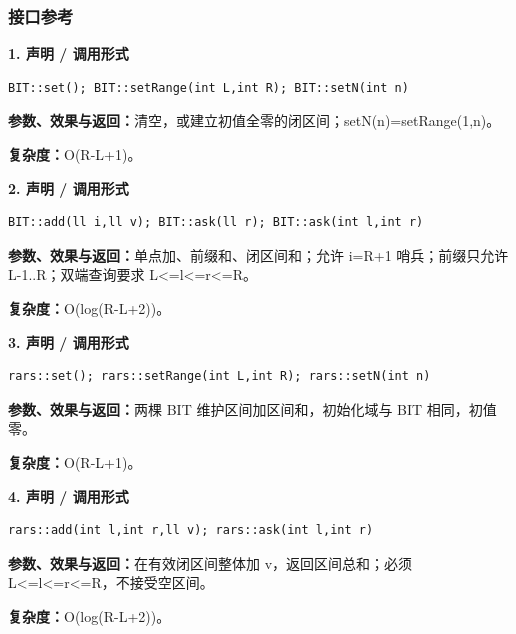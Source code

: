 \documentclass[UTF8,a4paper,10pt]{ctexart}
\begin{document}
\subsubsection*{接口参考}
\noindent\begin{minipage}{\textwidth}
\textbf{1. 声明 / 调用形式}
\begin{lstlisting}
BIT::set(); BIT::setRange(int L,int R); BIT::setN(int n)
\end{lstlisting}
\textbf{参数、效果与返回：}清空，或建立初值全零的闭区间；setN(n)=setRange(1,n)。

\textbf{复杂度：}O(R-L+1)。

\end{minipage}\par\vspace{0.4em}
\noindent\begin{minipage}{\textwidth}
\textbf{2. 声明 / 调用形式}
\begin{lstlisting}
BIT::add(ll i,ll v); BIT::ask(ll r); BIT::ask(int l,int r)
\end{lstlisting}
\textbf{参数、效果与返回：}单点加、前缀和、闭区间和；允许 i=R+1 哨兵；前缀只允许 L-1..R；双端查询要求 L<=l<=r<=R。

\textbf{复杂度：}O(log(R-L+2))。

\end{minipage}\par\vspace{0.4em}
\noindent\begin{minipage}{\textwidth}
\textbf{3. 声明 / 调用形式}
\begin{lstlisting}
rars::set(); rars::setRange(int L,int R); rars::setN(int n)
\end{lstlisting}
\textbf{参数、效果与返回：}两棵 BIT 维护区间加区间和，初始化域与 BIT 相同，初值零。

\textbf{复杂度：}O(R-L+1)。

\end{minipage}\par\vspace{0.4em}
\noindent\begin{minipage}{\textwidth}
\textbf{4. 声明 / 调用形式}
\begin{lstlisting}
rars::add(int l,int r,ll v); rars::ask(int l,int r)
\end{lstlisting}
\textbf{参数、效果与返回：}在有效闭区间整体加 v，返回区间总和；必须 L<=l<=r<=R，不接受空区间。

\textbf{复杂度：}O(log(R-L+2))。

\end{minipage}\par\vspace{0.4em}
\end{document}
